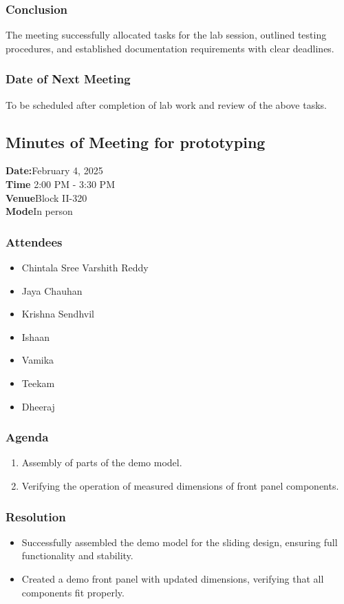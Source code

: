 \documentclass[12pt,a4paper]{article}
\begin{document}
\subsubsection*{Conclusion}
The meeting successfully allocated tasks for the lab session, outlined testing procedures, and established documentation requirements with clear deadlines.
\subsubsection*{Date of Next Meeting}
To be scheduled after completion of lab work and review of the above tasks.


\subsection*{Minutes of Meeting for prototyping}

\textbf{Date:}February 4, 2025\\
\textbf{Time} 2:00 PM - 3:30 PM\\
\textbf{Venue}Block II-320 \\
\textbf{Mode}In person\\

\subsubsection*{Attendees}
\begin{itemize}
    \item Chintala Sree Varshith Reddy
    \item Jaya Chauhan
    \item Krishna Sendhvil
    \item Ishaan
    \item Vamika
    \item Teekam
    \item Dheeraj
\end{itemize}

\subsubsection*{Agenda}
\begin{enumerate}
    \item Assembly of parts of the demo model.
    \item Verifying the operation of measured dimensions of front panel components.
\end{enumerate}

\subsubsection*{Resolution}
\begin{itemize}
    \item Successfully assembled the demo model for the sliding design, ensuring full functionality and stability.
    \item Created a demo front panel with updated dimensions, verifying that all components fit properly.
\end{itemize}
\end{document}
